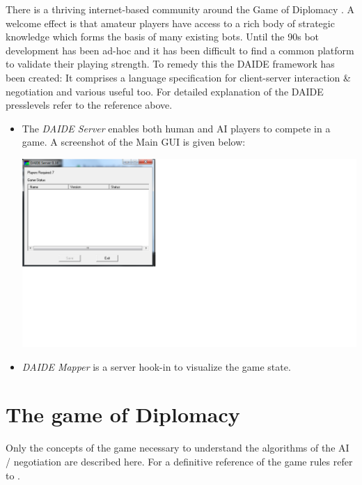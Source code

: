 \documentclass[pdftex,12pt,a4paper]{report}
\begin{document}
There is a thriving internet-based community around the Game of
Diplomacy \cite{DipArchive04} \cite{DipPouch04}. A welcome effect is
that amateur players have access to a rich body of strategic knowledge
which forms the basis of many existing bots. Until the 90s bot
development has been ad-hoc and it has been difficult to find a common
platform to validate their playing strength. To remedy this the DAIDE
framework \cite{Daide04} has been created: It comprises a language
specification for client-server interaction \cite{DAIDEsyntax10} \&
negotiation and various useful too. For detailed explanation of the 
DAIDE presslevels refer to the reference above.

\begin{itemize}

\item The \textit{DAIDE Server} enables both human and AI players to
      compete in a game. A screenshot of the Main GUI is given below:

\includegraphics{./images/DAIDEServer.png}

\item \textit{DAIDE Mapper} is a server hook-in to visualize
      the game state.

\end{itemize}



\pagebreak

\chapter{The game of Diplomacy}

Only the concepts of the game necessary to understand the 
algorithms of the AI / negotiation are described here. For a
definitive reference of the game rules refer to \cite{DiploRules00}.
\end{document}
